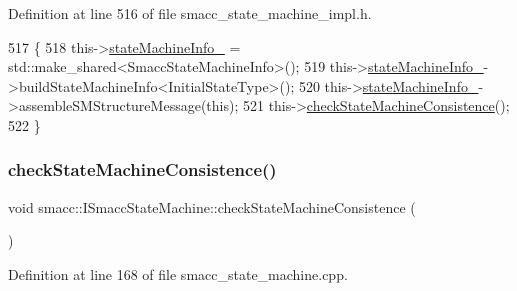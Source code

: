 Definition at line 516 of file smacc\+\_\+state\+\_\+machine\+\_\+impl.\+h.


\begin{DoxyCode}
517   \{
518     this->\hyperlink{classsmacc_1_1ISmaccStateMachine_a0914aa27c3f51374c338d89a32b135d1}{stateMachineInfo\_} = std::make\_shared<SmaccStateMachineInfo>();
519     this->\hyperlink{classsmacc_1_1ISmaccStateMachine_a0914aa27c3f51374c338d89a32b135d1}{stateMachineInfo\_}->buildStateMachineInfo<InitialStateType>();
520     this->\hyperlink{classsmacc_1_1ISmaccStateMachine_a0914aa27c3f51374c338d89a32b135d1}{stateMachineInfo\_}->assembleSMStructureMessage(\textcolor{keyword}{this});
521     this->\hyperlink{classsmacc_1_1ISmaccStateMachine_af34fa8346ae3f52882704422d59b9055}{checkStateMachineConsistence}();
522   \}
\end{DoxyCode}
\mbox{\label{classsmacc_1_1ISmaccStateMachine_af34fa8346ae3f52882704422d59b9055}} 
\subsubsection{\texorpdfstring{check\+State\+Machine\+Consistence()}{checkStateMachineConsistence()}}
{\footnotesize\ttfamily void smacc\+::\+I\+Smacc\+State\+Machine\+::check\+State\+Machine\+Consistence (\begin{DoxyParamCaption}{ }\end{DoxyParamCaption})\hspace{0.3cm}{\ttfamily [protected]}}



Definition at line 168 of file smacc\+\_\+state\+\_\+machine.\+cpp.


